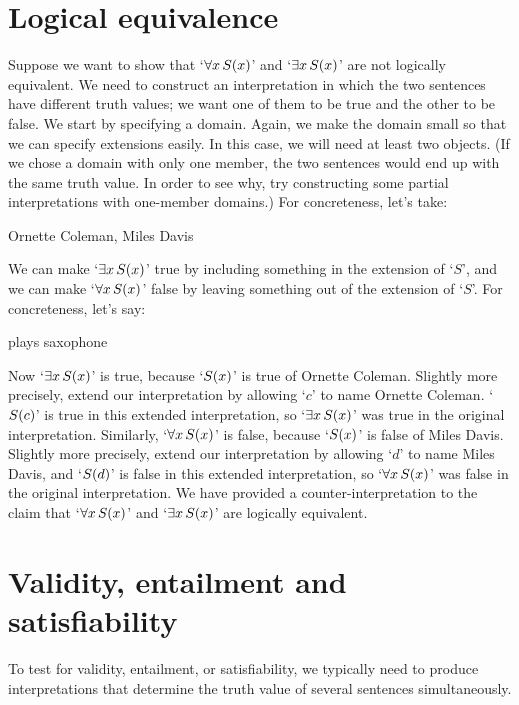\section{Logical equivalence}
Suppose we want to show that `$\forall x\, \mathord{S}(x)$' and `$\exists x\, \mathord{S}(x)$' are not logically equivalent. We need to construct an interpretation in which the two sentences have different truth values; we want one of them to be true and the other to be false. We start by specifying a domain. Again, we make the domain small so that we can specify extensions easily. In this case, we will need at least two objects. (If we chose a domain with only one member, the two sentences would end up with the same truth value. In order to see why, try constructing some partial interpretations with one-member domains.) For concreteness, let's take:
	\begin{ekey}
		\item[\text{domain}] Ornette Coleman, Miles Davis
	\end{ekey}
We can make `$\exists x\, \mathord{S}(x)$' true by including something in the extension of `$S$', and we can make `$\forall x\, \mathord{S}(x)$' false by leaving something out of the extension of `$S$'. For concreteness, let's say:
	\begin{ekey}
		\item[\atom{S}{x}]  plays saxophone
	\end{ekey}
Now `$\exists x\, \mathord{S}(x)$' is true, because `$\mathord{S}(x)$' is true of Ornette Coleman. Slightly more precisely, extend our interpretation by allowing `$c$' to name Ornette Coleman.  `$\mathord{S}(c)$' is true in this extended interpretation, so `$\exists x\, \mathord{S}(x)$' was true in the original interpretation. Similarly, `$\forall x\, \mathord{S}(x)$' is false, because `$\mathord{S}(x)$' is false of Miles Davis. Slightly more precisely, extend our interpretation by allowing `$d$' to name Miles Davis, and `$\mathord{S}(d)$' is false in this extended interpretation, so `$\forall x\, \mathord{S}(x)$' was false in the original interpretation. We have provided a counter-interpretation to the claim that `$\forall x\, \mathord{S}(x)$' and `$\exists x\, \mathord{S}(x)$' are logically equivalent.

\section{Validity, entailment and satisfiability}
To test for validity, entailment, or satisfiability, we typically need to produce interpretations that determine the truth value of several sentences simultaneously.

